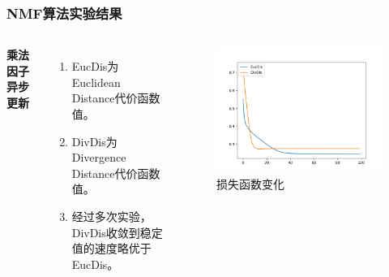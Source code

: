 \documentclass[UTF8,mathserif]{beamer}
\begin{document}
\begin{frame}
\frametitle{NMF算法实验结果}
\begin{columns}[c] %
	
	\textbf{乘法因子异步更新}
	\begin{enumerate}
		\item EucDis为Euclidean Distance代价函数值。
		\item DivDis为Divergence Distance代价函数值。
		\item 经过多次实验，DivDis收敛到稳定值的速度略优于EucDis。
	\end{enumerate}
	\begin{figure}[h]%
		\centering  %
		\includegraphics[width=1.2\linewidth]{image/Correct_answer}  %
		\caption{损失函数变化}  %
		\label{fig:mcmthesis-logo}   %
	\end{figure}
	
\end{columns}
\end{frame}
\end{document}
